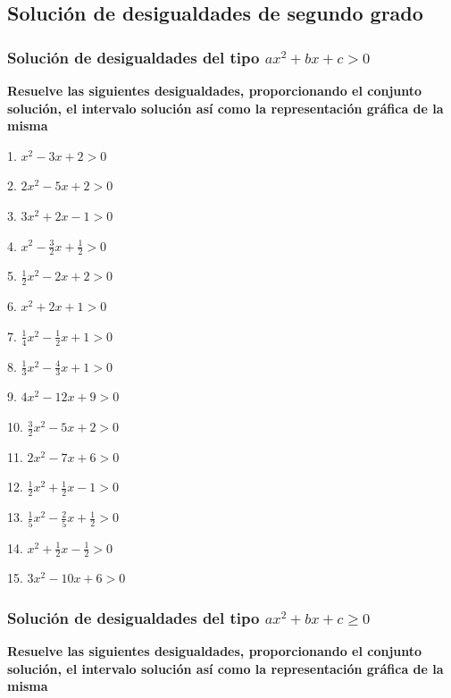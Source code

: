 \documentclass[12pt]{article}
\begin{document}
\subsection{Solución de desigualdades de segundo
grado}\label{soluciuxf3n-de-desigualdades-de-segundo-grado}
\subsubsection{\texorpdfstring{Solución de desigualdades del tipo
\(ax^2+bx+c>0\)}{Solución de desigualdades del tipo ax\^{}2+bx+c\textgreater0}}\label{soluciuxf3n-de-desigualdades-del-tipo-ax2bxc0}
\textbf{Resuelve las siguientes desigualdades, proporcionando el
conjunto solución, el intervalo solución así como la representación
gráfica de la misma}

\begin{multicols}{2}

1. $x^2-3x+2>0$

2. $2x^2-5x+2>0$

3. $3x^2+2x-1>0$

4. $x^2-\frac{3}{2}x+\frac{1}{2}>0$

5. $\frac{1}{2}x^2-2x+2>0$

6. $x^2+2x+1>0$

7. $\frac{1}{4}x^2-\frac{1}{2}x+1>0$

8. $\frac{1}{3}x^2-\frac{4}{3}x+1>0$

9. $4x^2-12x+9>0$

10. $\frac{3}{2}x^2-5x+2>0$

11. $2x^2-7x+6>0$

12. $\frac{1}{2}x^2+\frac{1}{2}x-1>0$

13. $\frac{1}{5}x^2-\frac{2}{5}x+\frac{1}{2}>0$

14. $x^2+\frac{1}{2}x-\frac{1}{2}>0$

15. $3x^2-10x+6>0$

\end{multicols}

\subsubsection{\texorpdfstring{Solución de desigualdades del tipo
\(ax^2+bx+c\geq 0\)}{Solución de desigualdades del tipo ax\^{}2+bx+c\textbackslash geq 0}}\label{soluciuxf3n-de-desigualdades-del-tipo-ax2bxcgeq-0}
\textbf{Resuelve las siguientes desigualdades, proporcionando el
conjunto solución, el intervalo solución así como la representación
gráfica de la misma}
\end{document}
